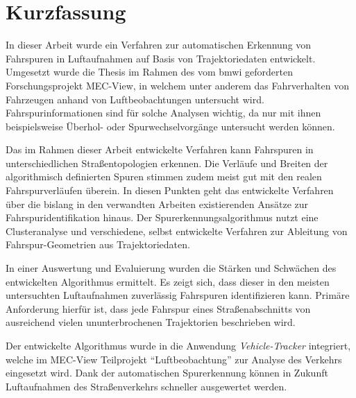 
\chapter{Kurzfassung}

In dieser Arbeit wurde ein Verfahren zur automatischen Erkennung von Fahrspuren in Luftaufnahmen
auf Basis von Trajektoriedaten entwickelt. Umgesetzt wurde die Thesis im Rahmen des vom \acrshort*{bmwi}
geforderten Forschungsprojekt MEC-View, in welchem unter anderem das Fahrverhalten von Fahrzeugen
anhand von Luftbeobachtungen untersucht wird. Fahrspurinformationen sind für solche Analysen
wichtig, da nur mit ihnen beispielsweise Überhol- oder Spurwechselvorgänge untersucht werden können.

Das im Rahmen dieser Arbeit entwickelte Verfahren kann Fahrspuren in unterschiedlichen Straßentopologien
erkennen. Die Verläufe und Breiten der algorithmisch definierten Spuren stimmen zudem meist gut mit den realen
Fahrspurverläufen überein. In diesen Punkten geht das entwickelte Verfahren über die bislang in den
verwandten Arbeiten existierenden Ansätze zur Fahrspuridentifikation hinaus.
Der Spurerkennungsalgorithmus nutzt eine Clusteranalyse und verschiedene, selbst entwickelte Verfahren zur
Ableitung von Fahrspur-Geometrien aus Trajektoriedaten.

In einer Auswertung und Evaluierung wurden die Stärken und Schwächen des entwickelten Algorithmus ermittelt.
Es zeigt sich, dass dieser in den meisten untersuchten Luftaufnahmen zuverlässig Fahrspuren identifizieren kann.
Primäre Anforderung hierfür ist, dass jede Fahrspur eines Straßenabschnitts von ausreichend vielen ununterbrochenen
Trajektorien beschrieben wird.

Der entwickelte Algorithmus wurde in die Anwendung \textit{Vehicle-Tracker} integriert,
welche im MEC-View Teilprojekt ``Luftbeobachtung'' zur Analyse des Verkehrs eingesetzt wird.
Dank der automatischen Spurerkennung können in Zukunft Luftaufnahmen des Straßenverkehrs schneller
ausgewertet werden.


